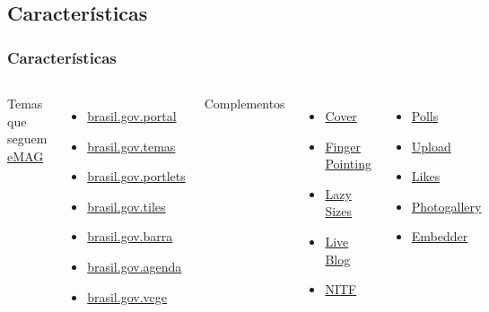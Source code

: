 \documentclass{beamer}
\begin{document}
\subsection{Características}
\begin{frame}
    \frametitle{Características}
    \begin{columns}
        Temas que seguem \href{http://emag.governoeletronico.gov.br/}{eMAG}
        \begin{itemize}
            \item \href{https://github.com/plonegovbr/brasil.gov.portal}{brasil.gov.portal} \pause
            \item \href{https://github.com/plonegovbr/brasil.gov.temas}{brasil.gov.temas} \pause
            \item \href{https://github.com/plonegovbr/brasil.gov.portlets}{brasil.gov.portlets} \pause
            \item \href{https://github.com/plonegovbr/brasil.gov.tiles}{brasil.gov.tiles} \pause
            \item \href{https://github.com/plonegovbr/brasil.gov.barra}{brasil.gov.barra} \pause
            \item \href{https://github.com/plonegovbr/brasil.gov.agenda}{brasil.gov.agenda} \pause
            \item \href{https://github.com/plonegovbr/brasil.gov.vcge}{brasil.gov.vcge}
        \end{itemize}

        Complementos
        \begin{itemize}
            \item \href{https://github.com/collective/collective.cover}{Cover} \pause
            \item \href{https://github.com/collective/collective.fingerpointing}{Finger Pointing} \pause
            \item \href{https://github.com/collective/collective.lazysizes}{Lazy Sizes} \pause
            \item \href{https://github.com/collective/collective.liveblog}{Live Blog} \pause
            \item \href{https://github.com/collective/collective.nitf}{NITF} \pause
        \end{itemize}
        \begin{itemize}
            \item \href{https://github.com/collective/collective.polls}{Polls} \pause
            \item \href{https://github.com/collective/collective.upload}{Upload} \pause
            \item \href{https://github.com/collective/sc.social.likes}{Likes} \pause
            \item \href{https://github.com/collective/sc.photogallery}{Photogallery} \pause
            \item \href{https://github.com/collective/sc.embedder}{Embedder}
        \end{itemize}
    \end{columns}
\end{frame}
\end{document}
